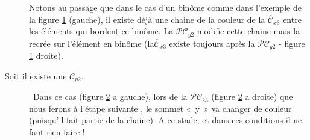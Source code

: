 \begin{adjustwidth}{3.5em}{0pt}
\begin{description}
Notons au passage que dans le cas d'un binôme comme dans l'exemple de la figure \ref{fig:cas4_etape2_bionome} (gauche), il existe déjà une chaine de la couleur de la $\overline{\mathcal{C}}_{x3}$ entre les éléments qui bordent ce binôme. La $\mathcal{PC}_{y2}$ modifie cette chaine mais la recrée sur l’élément en binôme (la$\overline{\mathcal{C}}_{x3}$ existe toujours après la $\mathcal{PC}_{y2}$ - figure \ref{fig:cas4_etape2_bionome} droite).
\begin{figure}[!ht]\centering
	\begin{changemargin}{0cm}{-3cm}
		\begin{center}
			
			\hspace{15pt}
			
		\end{center}
	\end{changemargin}
	\begin{changemargin}{3cm}{0cm}
	\caption{}\label{fig:cas4_etape2_bionome}
	\end{changemargin}
\end{figure}	
\FloatBarrier

		\item[Soit il existe une $\overline{\mathcal{C}}_{y2}$.]\
Dans ce cas (figure \ref{fig:cas4_etape2_rien} a gauche), lors de la $\mathcal{PC}_{23}$ (figure \ref{fig:cas4_etape2_rien} a droite) que nous ferons à l’étape suivante , le sommet «~y~» va changer de couleur (puisqu’il fait partie de la chaine). A ce stade, et dans ces conditions il ne faut rien faire !
\begin{figure}[!ht]\centering
	\begin{changemargin}{0cm}{-3cm}
		\begin{center}
			
			\hspace{15pt}
			
		\end{center}
	\end{changemargin}
	\begin{changemargin}{3cm}{0cm}
	\caption{}\label{fig:cas4_etape2_rien}
	\end{changemargin}
\end{figure}	
\FloatBarrier

	\end{description}
\end{adjustwidth}

